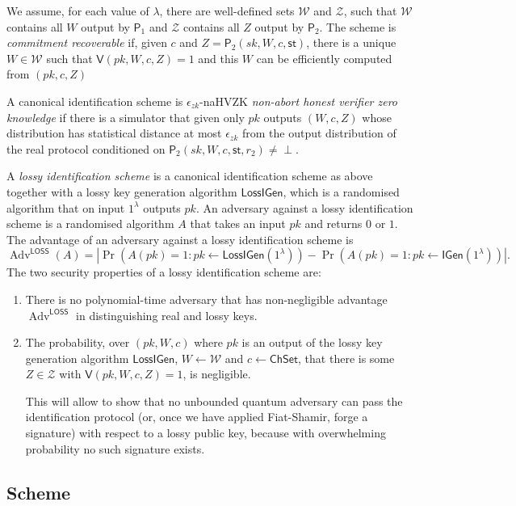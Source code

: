 \documentclass{llncs}
\DeclareMathOperator{\Adv}{Adv}
\newcommand{\IGen}{\mathsf{IGen}}
\newcommand{\PP}{\mathsf{P}}
\newcommand{\VV}{\mathsf{V}}
\newcommand{\Wset}{\mathcal{W}}
\newcommand{\Zset}{\mathcal{Z}}
\newcommand{\ChSet}{\textsf{ChSet}}
\newcommand{\St}{\textsf{st}}
\newcommand{\LossIGen}{\mathsf{LossIGen}}
\begin{document}
We assume, for each value of $\lambda$, there are well-defined sets $\Wset$ and $\Zset$, such that $\Wset$ contains all $W$ output by $\PP_1$ and $\Zset$ contains all $Z$ output by $\PP_2$. 
The scheme is \emph{commitment recoverable} if, given $c$ and $Z = \PP_2( sk, W, c, \St )$, there is a unique $W \in \Wset$ such that $\VV( pk, W, c, Z ) = 1$ and this $W$ can be efficiently computed from $(pk, c, Z)$

A canonical identification scheme is $\epsilon_{zk}$-naHVZK \emph{non-abort honest verifier zero knowledge} if there is a simulator that given only $pk$ outputs $(W, c, Z)$ whose distribution has statistical distance at most $\epsilon_{zk}$ from the output distribution of the real protocol conditioned on $\PP_2( sk, W, c, \St, r_2 ) \ne \perp$.


A \emph{lossy identification scheme} is a canonical identification scheme as above together with a lossy key generation algorithm $\LossIGen$, which is a randomised algorithm that on input $1^\lambda$ outputs $pk$.
An adversary against a lossy identification scheme is a randomised algorithm $A$ that takes an input $pk$ and returns $0$ or $1$.
The advantage of an adversary against a lossy identification scheme is 
\[
   \Adv^{\textsf{LOSS}}(A) = \left|
   \Pr\left( A( pk ) = 1 : pk \leftarrow \LossIGen(1^\lambda) \right) - \Pr\left( A( pk ) = 1 : pk \leftarrow \IGen( 1^\lambda ) \right) \right|.
\]
The two security properties of a lossy identification scheme are:
\begin{enumerate}
\item There is no polynomial-time adversary that has non-negligible advantage $\Adv^{\textsf{LOSS}}$ in distinguishing real and lossy keys.
\item The probability, over $(pk, W, c)$ where $pk$ is an output of the lossy key generation algorithm $\LossIGen$, $W \leftarrow \Wset$ and $c \leftarrow \ChSet$, that there is some $Z \in \Zset$ with $\VV( pk, W, c, Z ) = 1$, is negligible.

This will allow to show that no unbounded quantum adversary can pass the identification protocol (or, once we have applied Fiat-Shamir, forge a signature) with respect to a lossy public key, because with overwhelming probability no such signature exists.
\end{enumerate}


\subsection{Scheme}
\end{document}
